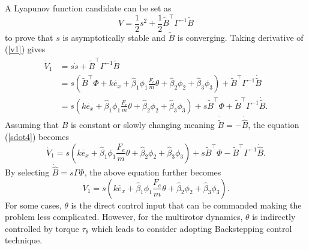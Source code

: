 A Lyapunov function candidate can be set as
\begin{equation}
V=\frac{1}{2}s^2+\frac{1}{2}\tilde{B}^\top \Gamma^{-1}\tilde{B}
\label{v1}
\end{equation}
to prove that $s$ is asymptotically stable and $\tilde{B}$ is converging. Taking derivative of (\ref{v1}) gives
\begin{align}
\dot{V}_1&=s\dot{s}+\tilde{B}^\top \Gamma^{-1}\dot{\tilde{B}}
\\&=s(\tilde{B}^\top\Phi+k\dot{e_x}+\hat{\beta}_1\phi_1\frac{F_e}{m}\theta+\hat{\beta}_2\phi_2+\hat{\beta}_3\phi_3)+\tilde{B}^\top \Gamma^{-1}\dot{\tilde{B}}
\\&=s(k\dot{e_x}+\hat{\beta}_1\phi_1\frac{F_e}{m}\theta+\hat{\beta}_2\phi_2+\hat{\beta}_3\phi_3)+s\tilde{B}^\top\Phi+\tilde{B}^\top \Gamma^{-1}\dot{\tilde{B}}.
\label{sdot4}
\end{align}
Assuming that $B$ is constant or slowly changing meaning $\dot{\tilde{B}}=-\dot{\hat{B}}$, the equation (\ref{sdot4}) becomes 
\begin{equation}
\dot{V}_1=s(k\dot{e_x}+\hat{\beta}_1\phi_1\frac{F_e}{m}\theta+\hat{\beta}_2\phi_2+\hat{\beta}_3\phi_3)+s\tilde{B}^\top\Phi-\tilde{B}^\top \Gamma^{-1}\dot{\hat{B}}.
\end{equation}
By selecting $\dot{\hat{B}}=s\Gamma\Phi$, the above equation further becomes 
\begin{equation}
\dot{V}_1=s(k\dot{e_x}+\hat{\beta}_1\phi_1\frac{F_e}{m}\theta+\hat{\beta}_2\phi_2+\hat{\beta}_3\phi_3).
\end{equation}
For some cases, $\theta$ is the direct control input that can be commanded making the problem less complicated. However, for the multirotor dynamics, $\theta$ is indirectly controlled by torque $\tau_\theta$ which leads to consider adopting Backstepping control technique. 